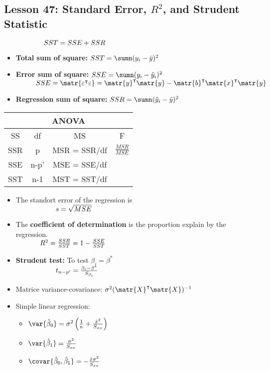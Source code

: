 \documentclass[10pt, french]{article}
\begin{document}
\begin{multicols*}{3}
\section*{Lesson 47: Standard Error, $R^2$, and Strudent Statistic}
$\hspace*{2cm} SST = SSE + SSR$
\begin{itemize}[align=left,leftmargin=*]
  \item \textbf{Total sum of square:} $SST = \sumn (y_i - \bar{y})^2$
  \item \textbf{Error sum of square:} $SSE = \sumn (y_i - \hat{y}_i)^2$ \\
  $\hspace*{1cm} SSE = \matr{\varepsilon^\intercal\varepsilon} = \matr{y}^\intercal\matr{y} - \matr{b}^\intercal\matr{x}^\intercal\matr{y} $
  \item \textbf{Regression sum of square:} $SSR = \sumn (\hat{y}_i - \bar{y})^2$
\end{itemize}
\begin{center}
  \begin{tabular}{cccc}
    \hline
    \multicolumn{4}{c}{ANOVA} \\
    \hline
    SS & df & MS & F \\
    \hline
    SSR & p & MSR = SSR/df & $\frac{MSR}{MSE}$\\
    SSE & n-p' & MSE = SSE/df &\\
    SST & n-1 & MST = SST/df &\\
    \hline
  \end{tabular}
\end{center}
\begin{itemize}[align=left,leftmargin=*]
  \item The standort error of the regression is \\
  $\hspace*{2cm}  s=\sqrt{MSE}$
  \item The \textbf{coefficient of determination} is the proportion explain by the regression. \\
  $\hspace*{1.2cm} R^2 = \frac{SSR}{SST} = 1 - \frac{SSE}{SST}$
  \item \textbf{Strudent test:} To test $\beta_i = \beta^*$\\
  $\hspace*{2cm} t_{n-p'} = \frac{\beta_i - \beta^*}{S_{\beta_i}}$
  \item[] Matrice variance-covariance: $\sigma^2(\matr{X}^\intercal\matr{X})^{-1}$
  \item Simple linear regression:
  \begin{itemize}
    \item $\var{\hat{\beta}_0} = \sigma^2 \left(\frac{1}{n} + \frac{\bar{x}^2}{S_{xx}} \right)$
    \item $\var{\hat{\beta}_1} = \frac{\sigma^2}{S_{xx}}$
    \item $\covar{\hat{\beta}_0, \hat{\beta}_1} = -\frac{\bar{x}\sigma^2}{S_{xx}}$
  \end{itemize}
\end{itemize}
\columnbreak


\end{multicols*}
\end{document}
